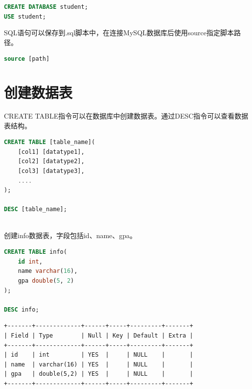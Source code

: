 \documentclass[12pt, openany, oneside]{book}
\begin{document}
\begin{lstlisting}[language=SQL]
CREATE DATABASE student;
USE student;
\end{lstlisting}

SQL语句可以保存到.sql脚本中，在连接MySQL数据库后使用source指定脚本路径。

\vspace{-0.5cm}

\begin{lstlisting}[language=SQL]
source [path]
\end{lstlisting}

\vspace{0.5cm}

\section{创建数据表}

CREATE TABLE指令可以在数据库中创建数据表。通过DESC指令可以查看数据表结构。

\vspace{-0.5cm}

\begin{lstlisting}[language=SQL]
CREATE TABLE [table_name](
    [col1] [datatype1],
    [col2] [datatype2],
    [col3] [datatype3],
    ....
);

DESC [table_name];
\end{lstlisting}

\vspace{0.5cm}

\\

创建info数据表，字段包括id、name、gpa。

\vspace{-0.5cm}

\begin{lstlisting}[language=SQL]
CREATE TABLE info(
    id int, 
    name varchar(16), 
    gpa double(5, 2)
);

DESC info;
\end{lstlisting}

\begin{tcolorbox}
\begin{verbatim}
+-------+-------------+------+-----+---------+-------+
| Field | Type        | Null | Key | Default | Extra |
+-------+-------------+------+-----+---------+-------+
| id    | int         | YES  |     | NULL    |       |
| name  | varchar(16) | YES  |     | NULL    |       |
| gpa   | double(5,2) | YES  |     | NULL    |       |
+-------+-------------+------+-----+---------+-------+
	\end{verbatim}
\end{tcolorbox}
\end{document}

